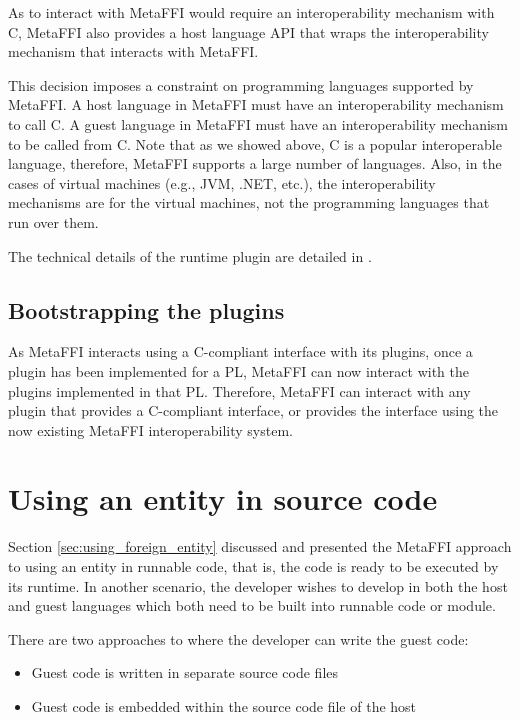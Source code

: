 \documentclass[sigplan,10pt,manuscript,nonacm]{acmart}
\begin{document}
As to interact with MetaFFI would require an interoperability mechanism with C, MetaFFI also provides a host language API that wraps the interoperability mechanism that interacts with MetaFFI.

This decision imposes a constraint on programming languages supported by MetaFFI. A host language in MetaFFI must have an interoperability mechanism to call C. A guest language in MetaFFI must have an interoperability mechanism to be called from C. Note that as we showed above, C is a popular interoperable language, therefore, MetaFFI supports a large number of languages. Also, in the cases of virtual machines (e.g., JVM, .NET, etc.), the interoperability mechanisms are for the virtual machines, not the programming languages that run over them.

The technical details of the runtime plugin are detailed in \cite{metaffi_paper}. 

\subsection{Bootstrapping the plugins}
As MetaFFI interacts using a C-compliant interface with its plugins, once a plugin has been implemented for a PL, MetaFFI can now interact with the plugins implemented in that PL. Therefore, MetaFFI can interact with any plugin that provides a C-compliant interface, or provides the interface using the now existing MetaFFI interoperability system.


\section{Using an entity in source code} \label{sec:using_entity_in_source_code}

Section \ref{sec:using_foreign_entity} discussed and presented the MetaFFI approach to using an entity in runnable code, that is, the code is ready to be executed by its runtime. In another scenario, the developer wishes to develop in both the host and guest languages which both need to be built into runnable code or module.

There are two approaches to where the developer can write the guest code:
\begin{itemize}
    \item Guest code is written in separate source code files
    \item Guest code is embedded within the source code file of the host
\end{itemize}
\end{document}
